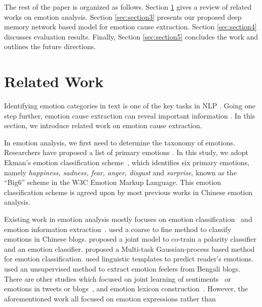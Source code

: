\documentclass[11pt,letterpaper]{article}
\begin{document}
\begin{CJK*}{UTF8}{gbsn}
The rest of the paper is organized as follows. Section \ref{sec:section2} gives a review of related works on emotion analysis. Section \ref{sec:section3} presents our proposed deep memory network based model for emotion cause extraction. Section \ref{sec:section4} discusses evaluation results. Finally, Section \ref{sec:section5} concludes the work and outlines the future directions.

\section{Related Work}
\label{sec:section2}

Identifying emotion categories in text is one of the key tasks in NLP \cite{liu2015sentiment}. Going one step further, emotion cause extraction can reveal  important information . In this section, we introduce related work on emotion  cause extraction. 

In emotion analysis, we first need to determine the taxonomy of emotions. Researchers have proposed a list of primary emotions \cite{plutchik1980emotion,ekman1984expression,turner2000origins}. In this study, we adopt Ekman's emotion classification scheme~\cite{ekman1984expression}, which identifies six primary emotions, namely \emph{happiness, sadness, fear, anger, disgust} and \emph{surprise},  known as the ``Big6'' scheme in the W3C Emotion Markup Language. This emotion classification scheme is agreed upon by most previous works in Chinese emotion analysis.

Existing work in emotion analysis mostly focuses on emotion classification~\cite{li2013sentence,zhou2016emotion} and emotion information extraction~\cite{Balahur2013Detecting}.  used a coarse to fine method to classify emotions in Chinese blogs.  proposed a joint model to co-train a polarity classifier and an emotion classifier.  proposed a Multi-task Gaussian-process based method for emotion classification.  used linguistic templates to predict reader's emotions.  used an unsupervised method to extract emotion feelers from Bengali blogs. There are 
other studies which focused on joint learning of sentiments~\cite{luojeam,mohtarami2013probabilistic} or emotions in tweets or blogs~\cite{quan2009construction,liu2013joint,hasegawa2013predicting,qadir2014learning,ou2014exploiting}, and emotion lexicon construction~\cite{mohammad2013crowdsourcing,yang2014topic,staiano2014depechemood}. However, the aforementioned work all focused on 
emotion expressions rather than 



\end{CJK*}
\end{document}

